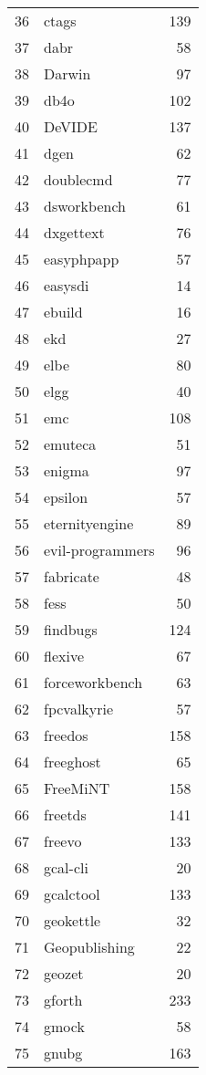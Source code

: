 \begin{table}[ht]
\begin{tabular}{rlr}
  36 & ctags & 139 \\ 
  37 & dabr &  58 \\ 
  38 & Darwin &  97 \\ 
  39 & db4o & 102 \\ 
  40 & DeVIDE & 137 \\ 
  41 & dgen &  62 \\ 
  42 & doublecmd &  77 \\ 
  43 & dsworkbench &  61 \\ 
  44 & dxgettext &  76 \\ 
  45 & easyphpapp &  57 \\ 
  46 & easysdi &  14 \\ 
  47 & ebuild &  16 \\ 
  48 & ekd &  27 \\ 
  49 & elbe &  80 \\ 
  50 & elgg &  40 \\ 
  51 & emc & 108 \\ 
  52 & emuteca &  51 \\ 
  53 & enigma &  97 \\ 
  54 & epsilon &  57 \\ 
  55 & eternityengine &  89 \\ 
  56 & evil-programmers &  96 \\ 
  57 & fabricate &  48 \\ 
  58 & fess &  50 \\ 
  59 & findbugs & 124 \\ 
  60 & flexive &  67 \\ 
  61 & forceworkbench &  63 \\ 
  62 & fpcvalkyrie &  57 \\ 
  63 & freedos & 158 \\ 
  64 & freeghost &  65 \\ 
  65 & FreeMiNT & 158 \\ 
  66 & freetds & 141 \\ 
  67 & freevo & 133 \\ 
  68 & gcal-cli &  20 \\ 
  69 & gcalctool & 133 \\ 
  70 & geokettle &  32 \\ 
  71 & Geopublishing &  22 \\ 
  72 & geozet &  20 \\ 
  73 & gforth & 233 \\ 
  74 & gmock &  58 \\ 
  75 & gnubg & 163 \\ 

\end{tabular}
\end{table}
